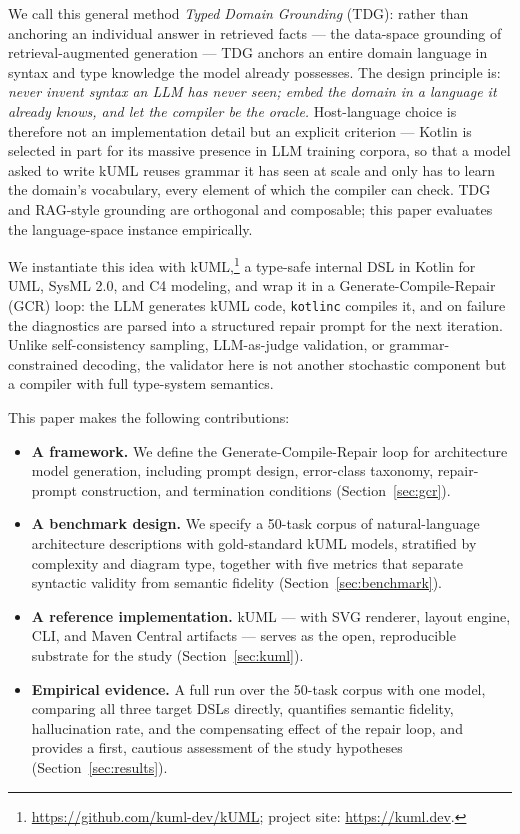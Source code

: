 \documentclass[acmsmall,nonacm]{acmart}
\begin{document}
We call this general method \emph{Typed Domain Grounding} (TDG): rather than anchoring an individual answer in retrieved facts --- the data-space grounding of retrieval-augmented generation --- TDG anchors an entire domain language in syntax and type knowledge the model already possesses. The design principle is: \emph{never invent syntax an LLM has never seen; embed the domain in a language it already knows, and let the compiler be the oracle.} Host-language choice is therefore not an implementation detail but an explicit criterion --- Kotlin is selected in part for its massive presence in LLM training corpora, so that a model asked to write kUML reuses grammar it has seen at scale and only has to learn the domain's vocabulary, every element of which the compiler can check. TDG and RAG-style grounding are orthogonal and composable; this paper evaluates the language-space instance empirically.

We instantiate this idea with kUML,\footnote{\url{https://github.com/kuml-dev/kUML}; project site: \url{https://kuml.dev}.} a type-safe internal DSL in Kotlin for UML, SysML 2.0, and C4 modeling, and wrap it in a Generate-Compile-Repair (GCR) loop: the LLM generates kUML code, \texttt{kotlinc} compiles it, and on failure the diagnostics are parsed into a structured repair prompt for the next iteration. Unlike self-consistency sampling, LLM-as-judge validation, or grammar-constrained decoding, the validator here is not another stochastic component but a compiler with full type-system semantics.

This paper makes the following contributions:

\begin{itemize}
  \item \textbf{A framework.} We define the Generate-Compile-Repair loop for architecture model generation, including prompt design, error-class taxonomy, repair-prompt construction, and termination conditions (Section~\ref{sec:gcr}).
  \item \textbf{A benchmark design.} We specify a 50-task corpus of natural-language architecture descriptions with gold-standard kUML models, stratified by complexity and diagram type, together with five metrics that separate syntactic validity from semantic fidelity (Section~\ref{sec:benchmark}).
  \item \textbf{A reference implementation.} kUML --- with SVG renderer, layout engine, CLI, and Maven Central artifacts --- serves as the open, reproducible substrate for the study (Section~\ref{sec:kuml}).
  \item \textbf{Empirical evidence.} A full run over the 50-task corpus with one model, comparing all three target DSLs directly, quantifies semantic fidelity, hallucination rate, and the compensating effect of the repair loop, and provides a first, cautious assessment of the study hypotheses (Section~\ref{sec:results}).
\end{itemize}
\end{document}
